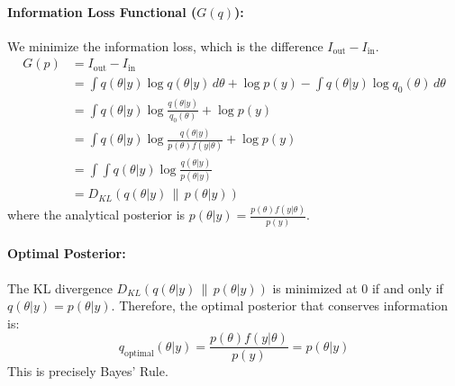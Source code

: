 \documentclass{article}
\theoremstyle{definition}
\begin{document}
\paragraph{Information Loss Functional ($G(q)$):}
We minimize the information loss, which is the difference $I_{\text{out}} - I_{\text{in}}$.
\begin{align}
G(p) &= I_{\text{out}} - I_{\text{in}}\\
 &= \int q(\theta|y) \log q(\theta|y) \, d\theta + \log p(y) - \int q(\theta|y) \log q_0(\theta) \, d\theta\\
 &= \int q(\theta|y)\log \frac{q(\theta|y)}{q_0(\theta)}+ \log p(y)\\
 &= \int q(\theta|y)\log \frac{q(\theta|y)}{p(\theta)f(y|\theta)}+ \log p(y)\\
 &= \int \int q(\theta|y)\log \frac{q(\theta|y)}{p(\theta|y)}\\
  &= D_{KL}(q(\theta|y) \,\|\, p(\theta|y))
\end{align}
where the analytical posterior is $p(\theta|y) = \frac{p(\theta)f(y|\theta)}{p(y)}$.


\paragraph{Optimal Posterior:}
The KL divergence $D_{KL}(q(\theta|y) \,\|\, p(\theta|y))$ is minimized at 0 if and only if $q(\theta|y) = p(\theta|y)$.
Therefore, the optimal posterior that conserves information is:
\begin{equation}
q_{\text{optimal}}(\theta|y) = \frac{p(\theta)f(y|\theta)}{p(y)} = p(\theta|y)
\end{equation}
This is precisely Bayes' Rule.

\end{document}
